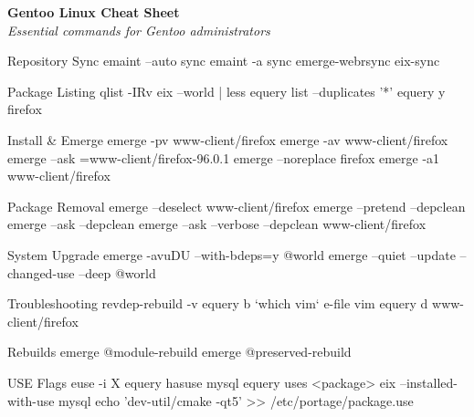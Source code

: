 \documentclass[10pt]{article}
\begin{document}
\pagestyle{empty}
\begin{center}
    {\Huge\textbf{Gentoo Linux Cheat Sheet}}\\ %
    \vspace{5pt}
    {\small\textit{Essential commands for Gentoo administrators}}
\end{center}

\begin{multicols}{2}

\begin{cheatbox}{Repository Sync}
emaint --auto sync
emaint -a sync
emerge-webrsync
eix-sync
\end{cheatbox}

\begin{cheatbox}{Package Listing}
qlist -IRv
eix --world | less
equery list --duplicates '*'
equery y firefox
\end{cheatbox}

\begin{cheatbox}{Install \& Emerge}
emerge -pv www-client/firefox
emerge -av www-client/firefox
emerge --ask =www-client/firefox-96.0.1
emerge --noreplace firefox
emerge -a1 www-client/firefox
\end{cheatbox}

\begin{cheatbox}{Package Removal}
emerge --deselect www-client/firefox
emerge --pretend --depclean
emerge --ask --depclean
emerge --ask --verbose --depclean www-client/firefox
\end{cheatbox}

\begin{cheatbox}{System Upgrade}
emerge -avuDU --with-bdeps=y @world
emerge --quiet --update --changed-use --deep @world
\end{cheatbox}

\begin{cheatbox}{Troubleshooting}
revdep-rebuild -v
equery b `which vim`
e-file vim
equery d www-client/firefox
\end{cheatbox}

\begin{cheatbox}{Rebuilds}
emerge @module-rebuild
emerge @preserved-rebuild
\end{cheatbox}

\begin{cheatbox}{USE Flags}
euse -i X
equery hasuse mysql
equery uses <package>
eix --installed-with-use mysql
echo 'dev-util/cmake -qt5' >> /etc/portage/package.use
\end{cheatbox}


\end{multicols}
\end{document}
